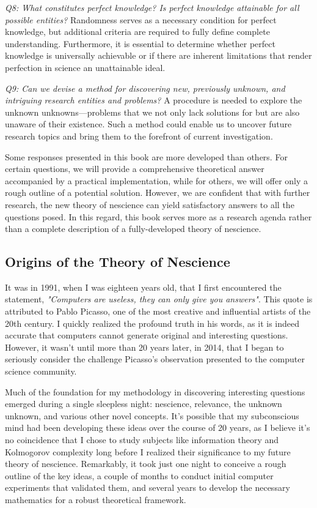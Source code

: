 \emph{Q8: What constitutes perfect knowledge? Is perfect knowledge attainable for all possible entities?} Randomness serves as a necessary condition for perfect knowledge, but additional criteria are required to fully define complete understanding. Furthermore, it is essential to determine whether perfect knowledge is universally achievable or if there are inherent limitations that render perfection in science an unattainable ideal.

\emph{Q9: Can we devise a method for discovering new, previously unknown, and intriguing research entities and problems?} A procedure is needed to explore the unknown unknowns—problems that we not only lack solutions for but are also unaware of their existence. Such a method could enable us to uncover future research topics and bring them to the forefront of current investigation.

Some responses presented in this book are more developed than others. For certain questions, we will provide a comprehensive theoretical answer accompanied by a practical implementation, while for others, we will offer only a rough outline of a potential solution. However, we are confident that with further research, the new theory of nescience can yield satisfactory answers to all the questions posed. In this regard, this book serves more as a research agenda rather than a complete description of a fully-developed theory of nescience.

%
%

\subsection*{Origins of the Theory of Nescience}

It was in 1991, when I was eighteen years old, that I first encountered the statement, \emph{"Computers are useless, they can only give you answers"}. This quote is attributed to Pablo Picasso, one of the most creative and influential artists of the 20th century. I quickly realized the profound truth in his words, as it is indeed accurate that computers cannot generate original and interesting questions. However, it wasn't until more than 20 years later, in 2014, that I began to seriously consider the challenge Picasso's observation presented to the computer science community.

Much of the foundation for my methodology in discovering interesting questions emerged during a single sleepless night: nescience, relevance, the unknown unknown, and various other novel concepts. It's possible that my subconscious mind had been developing these ideas over the course of 20 years, as I believe it's no coincidence that I chose to study subjects like information theory and Kolmogorov complexity long before I realized their significance to my future theory of nescience. Remarkably, it took just one night to conceive a rough outline of the key ideas, a couple of months to conduct initial computer experiments that validated them, and several years to develop the necessary mathematics for a robust theoretical framework.

